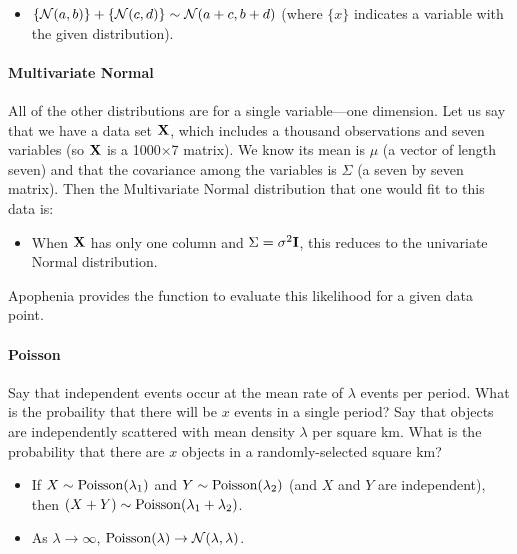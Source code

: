 \begin{itemize}
\item $\{{\cal N} (a,b)\} + \{{\cal N} (c,d)\} \sim {\cal N}
(a+c,b+d)$ (where $\{x\}$ indicates a variable with the given distribution).
\end{itemize}

\paragraph{Multivariate Normal}
All of the other distributions are for a single variable---one
dimension. Let us say that we have a data set ${\bf X}$, which includes a
thousand observations and seven variables (so ${\bf X}$ is a 1000$\times$7
matrix). We know its mean is
$\mu$ (a vector of length seven) and that the covariance among the
variables is $\Sigma$ (a seven by seven matrix). Then the Multivariate
Normal distribution that one would fit to this data is:


\begin{itemize}
\item When ${\bf X}$ has only one column and $\Sigma = \sigma^2{\bf I}$,
this reduces to the univariate Normal distribution.
\end{itemize}

Apophenia provides the function 
to evaluate this likelihood for a given data point.

\paragraph{Poisson}

Say that independent events occur at the mean rate of $\lambda$ events per 
period. What is the probaility that there will be $x$ events in a single 
period? Say that  objects are independently scattered
with mean density $\lambda$ per square km. What is the probability that
there are $x$ objects in a randomly-selected square km?

\begin{itemize}
\item If $X \sim {\rm Poisson}(\lambda_1)$ and $Y \sim {\rm
Poisson}(\lambda_2)$ (and $X$ and $Y$ are independent), then $(X + Y) \sim {\rm Poisson}(\lambda_1 +
\lambda_2)$.  \item As $\lambda\to\infty$,  ${\rm Poisson}(\lambda)
\to {\cal N}(\lambda, \lambda)$.  \end{itemize}

